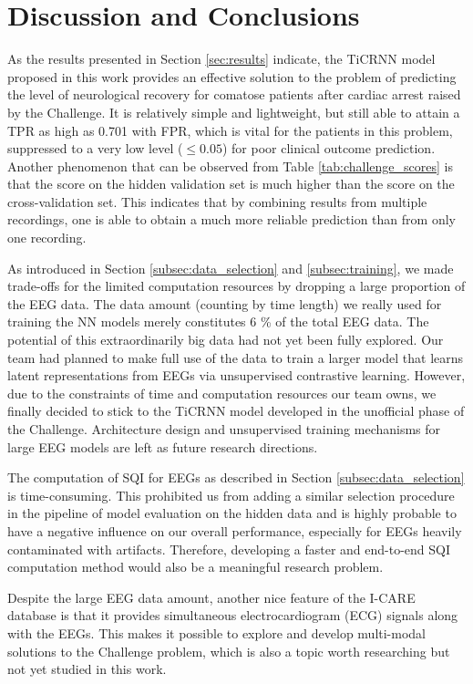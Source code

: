 \section{Discussion and Conclusions}
\label{sec:discu}


As the results presented in Section \ref{sec:results} indicate, the TiCRNN model proposed in this work provides an effective solution to the problem of predicting the level of neurological recovery for comatose patients after cardiac arrest raised by the Challenge. It is relatively simple and lightweight, but still able to attain a TPR as high as 0.701 with FPR, which is vital for the patients in this problem, suppressed to a very low level ($\le 0.05$) for poor clinical outcome prediction. Another phenomenon that can be observed from Table \ref{tab:challenge_scores} is that the score on the hidden validation set is much higher than the score on the cross-validation set. This indicates that by combining results from multiple recordings, one is able to obtain a much more reliable prediction than from only one recording.

As introduced in Section \ref{subsec:data_selection} and \ref{subsec:training}, we made trade-offs for the limited computation resources by dropping a large proportion of the EEG data. The data amount (counting by time length) we really used for training the NN models merely constitutes 6 \% of the total EEG data. The potential of this extraordinarily big data had not yet been fully explored. Our team had planned to make full use of the data to train a larger model that learns latent representations from EEGs via unsupervised contrastive learning. However, due to the constraints of time and computation resources our team owns, we finally decided to stick to the TiCRNN model developed in the unofficial phase of the Challenge. Architecture design and unsupervised training mechanisms for large EEG models are left as future research directions.

The computation of SQI for EEGs as described in Section \ref{subsec:data_selection} is time-consuming. This prohibited us from adding a similar selection procedure in the pipeline of model evaluation on the hidden data and is highly probable to have a negative influence on our overall performance, especially for EEGs heavily contaminated with artifacts. Therefore, developing a faster and end-to-end SQI computation method would also be a meaningful research problem.

Despite the large EEG data amount, another nice feature of the I-CARE database is that it provides simultaneous electrocardiogram (ECG) signals along with the EEGs. This makes it possible to explore and develop multi-modal solutions to the Challenge problem, which is also a topic worth researching but not yet studied in this work.
